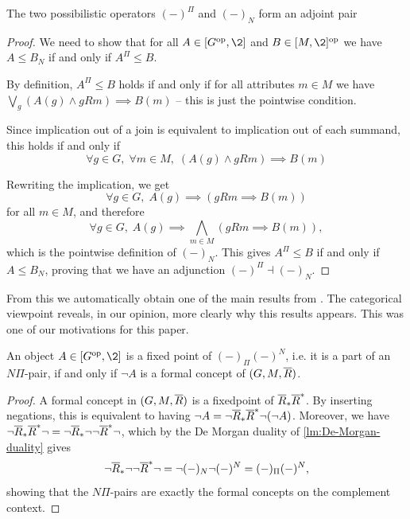 \begin{lemma}
    \label{lm:adjoint-Pi-N}
    The two possibilistic operators $(-)^\Pi$ and $(-)_N$ form an adjoint pair
    \begin{center}
    \end{center}
\end{lemma}
\begin{proof}
    We need to show that for all $A\in [G\op,\2]$ and $B\in [M,\2]\op$ we have $A\leq B_N$ if and only if $A^\Pi\leq B$. 
    
    By definition, $A^\Pi\leq B$ holds if and only if for all attributes $m\in M$ we have $\bigvee_g(A(g)\wedge gRm)\implies B(m)$ -- this is just the pointwise condition. 

    Since implication out of a join is equivalent to
    implication out of each summand, this holds if and only if
    \[\forall g\in G,\;\forall m\in M,\;(A(g)\wedge gRm)\implies B(m)\]

    Rewriting the implication, we get
    \[\forall g\in G,\;A(g)\implies (gRm\implies B(m))\]
    for all $m\in M$, and therefore
    \[\forall g\in G,\;A(g)\implies\bigwedge_{m\in M}(gRm\implies B(m)),\]
    which is the pointwise definition of $(-)_N$. This gives $A^\Pi\leq B$ if and only if $A\leq B_N$, proving that we have an adjunction $(-)^\Pi\dashv (-)_N$.
\end{proof}

From this we automatically obtain one of the main results from \cite{yakub-djouadi-dubois-prade_2016}. The categorical viewpoint reveals, in our opinion, more clearly why this results appears. This was one of our motivations for this paper. 

\begin{corollary}
    An object $A \in [G\op, \2]$ is a fixed point of $(-)_\Pi (-)^N$, i.e. it is a part of an $N\Pi$-pair, if and only if $\neg A$ is a formal concept of $(G,M,\overline{R})$.
\end{corollary}
\begin{proof}
    A formal concept in $(G,M,\overline{R})$ is a fixedpoint of $\overline{R}_*\overline{R}^*$. By inserting negations, this is equivalent to having $\neg A = \neg\overline{R}_*\overline{R}^* \neg (\neg A)$. Moreover, we have $\neg\overline{R}_*\overline{R}^*\neg = \neg\overline{R}_* \neg\neg\overline{R}^*\neg$, which by the De Morgan duality of \cref{lm:De-Morgan-duality} gives 
    \[\neg\overline{R}_* \neg \neg \overline{R}^*\neg = \neg (-)_N \neg (-)^N = (-)_\Pi (-)^N,\]
    showing that the $N\Pi$-pairs are exactly the formal concepts on the complement context. 
\end{proof}

